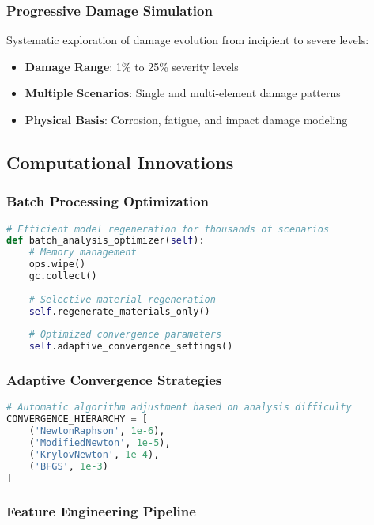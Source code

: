 \documentclass[12pt,a4paper]{article}
\begin{document}
\subsubsection{Progressive Damage Simulation}

Systematic exploration of damage evolution from incipient to severe levels:
\begin{itemize}
    \item \textbf{Damage Range}: 1\% to 25\% severity levels
    \item \textbf{Multiple Scenarios}: Single and multi-element damage patterns
    \item \textbf{Physical Basis}: Corrosion, fatigue, and impact damage modeling
\end{itemize}

\subsection{Computational Innovations}

\subsubsection{Batch Processing Optimization}

\begin{lstlisting}[language=Python, caption=Batch Analysis Optimization]
# Efficient model regeneration for thousands of scenarios
def batch_analysis_optimizer(self):
    # Memory management
    ops.wipe()
    gc.collect()
    
    # Selective material regeneration
    self.regenerate_materials_only()
    
    # Optimized convergence parameters
    self.adaptive_convergence_settings()
\end{lstlisting}

\subsubsection{Adaptive Convergence Strategies}

\begin{lstlisting}[language=Python, caption=Adaptive Convergence Implementation]
# Automatic algorithm adjustment based on analysis difficulty
CONVERGENCE_HIERARCHY = [
    ('NewtonRaphson', 1e-6),
    ('ModifiedNewton', 1e-5), 
    ('KrylovNewton', 1e-4),
    ('BFGS', 1e-3)
]
\end{lstlisting}

\subsubsection{Feature Engineering Pipeline}
\end{document}
